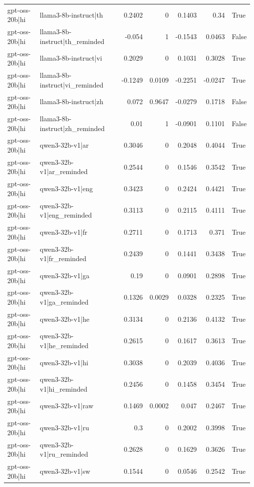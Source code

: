 \begin{table}
\begin{tabular}{l l r r r r l}
gpt-oss-20b|hi & llama3-8b-instruct|th & 0.2402 & 0 & 0.1403 & 0.34 & True \\
gpt-oss-20b|hi & llama3-8b-instruct|th_reminded & -0.054 & 1 & -0.1543 & 0.0463 & False \\
gpt-oss-20b|hi & llama3-8b-instruct|vi & 0.2029 & 0 & 0.1031 & 0.3028 & True \\
gpt-oss-20b|hi & llama3-8b-instruct|vi_reminded & -0.1249 & 0.0109 & -0.2251 & -0.0247 & True \\
gpt-oss-20b|hi & llama3-8b-instruct|zh & 0.072 & 0.9647 & -0.0279 & 0.1718 & False \\
gpt-oss-20b|hi & llama3-8b-instruct|zh_reminded & 0.01 & 1 & -0.0901 & 0.1101 & False \\
gpt-oss-20b|hi & qwen3-32b-v1|ar & 0.3046 & 0 & 0.2048 & 0.4044 & True \\
gpt-oss-20b|hi & qwen3-32b-v1|ar_reminded & 0.2544 & 0 & 0.1546 & 0.3542 & True \\
gpt-oss-20b|hi & qwen3-32b-v1|eng & 0.3423 & 0 & 0.2424 & 0.4421 & True \\
gpt-oss-20b|hi & qwen3-32b-v1|eng_reminded & 0.3113 & 0 & 0.2115 & 0.4111 & True \\
gpt-oss-20b|hi & qwen3-32b-v1|fr & 0.2711 & 0 & 0.1713 & 0.371 & True \\
gpt-oss-20b|hi & qwen3-32b-v1|fr_reminded & 0.2439 & 0 & 0.1441 & 0.3438 & True \\
gpt-oss-20b|hi & qwen3-32b-v1|ga & 0.19 & 0 & 0.0901 & 0.2898 & True \\
gpt-oss-20b|hi & qwen3-32b-v1|ga_reminded & 0.1326 & 0.0029 & 0.0328 & 0.2325 & True \\
gpt-oss-20b|hi & qwen3-32b-v1|he & 0.3134 & 0 & 0.2136 & 0.4132 & True \\
gpt-oss-20b|hi & qwen3-32b-v1|he_reminded & 0.2615 & 0 & 0.1617 & 0.3613 & True \\
gpt-oss-20b|hi & qwen3-32b-v1|hi & 0.3038 & 0 & 0.2039 & 0.4036 & True \\
gpt-oss-20b|hi & qwen3-32b-v1|hi_reminded & 0.2456 & 0 & 0.1458 & 0.3454 & True \\
gpt-oss-20b|hi & qwen3-32b-v1|raw & 0.1469 & 0.0002 & 0.047 & 0.2467 & True \\
gpt-oss-20b|hi & qwen3-32b-v1|ru & 0.3 & 0 & 0.2002 & 0.3998 & True \\
gpt-oss-20b|hi & qwen3-32b-v1|ru_reminded & 0.2628 & 0 & 0.1629 & 0.3626 & True \\
gpt-oss-20b|hi & qwen3-32b-v1|sw & 0.1544 & 0 & 0.0546 & 0.2542 & True \\

\end{tabular}
\end{table}
